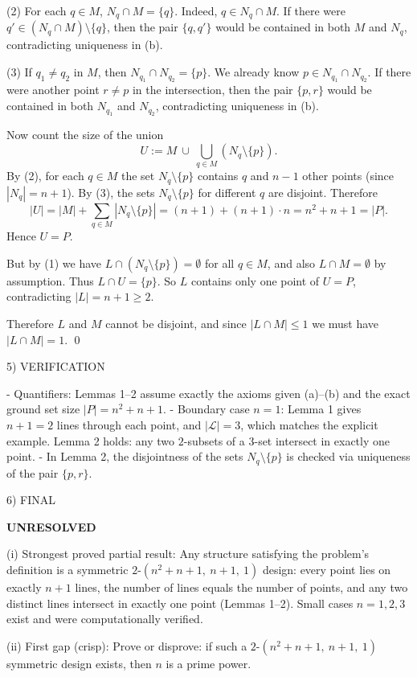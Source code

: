 (2) For each $q\in M$, $N_q\cap M = \{q\}$.
Indeed, $q\in N_q\cap M$. If there were $q'\in (N_q\cap M)\setminus\{q\}$, then the pair $\{q,q'\}$ would be contained in both $M$ and $N_q$, contradicting uniqueness in (b).

(3) If $q_1\ne q_2$ in $M$, then $N_{q_1}\cap N_{q_2}=\{p\}$.
We already know $p\in N_{q_1}\cap N_{q_2}$. If there were another point $r\ne p$ in the intersection, then the pair $\{p,r\}$ would be contained in both $N_{q_1}$ and $N_{q_2}$, contradicting uniqueness in (b).

Now count the size of the union
\[
U := M\ \cup\ \bigcup_{q\in M} (N_q\setminus\{p\}).
\]
By (2), for each $q\in M$ the set $N_q\setminus\{p\}$ contains $q$ and $n-1$ other points (since $|N_q|=n+1$).
By (3), the sets $N_q\setminus\{p\}$ for different $q$ are disjoint.
Therefore
\[
|U| = |M| + \sum_{q\in M} |N_q\setminus\{p\}| 
= (n+1) + (n+1)\cdot n 
= n^2+n+1 = |P|.
\]
Hence $U=P$.

But by (1) we have $L\cap (N_q\setminus\{p\})=\emptyset$ for all $q\in M$, and also $L\cap M=\emptyset$ by assumption. Thus $L\cap U = \{p\}$.
So $L$ contains only one point of $U=P$, contradicting $|L|=n+1\ge 2$.

Therefore $L$ and $M$ cannot be disjoint, and since $|L\cap M|\le 1$ we must have $|L\cap M|=1$.
\qed

5) VERIFICATION

- Quantifiers: Lemmas 1--2 assume exactly the axioms given (a)--(b) and the exact ground set size $|P|=n^2+n+1$.
- Boundary case $n=1$: Lemma 1 gives $n+1=2$ lines through each point, and $|\mathcal L|=3$, which matches the explicit example. Lemma 2 holds: any two $2$-subsets of a $3$-set intersect in exactly one point.
- In Lemma 2, the disjointness of the sets $N_q\setminus\{p\}$ is checked via uniqueness of the pair $\{p,r\}$.

6) FINAL

\textbf{UNRESOLVED}

(i) Strongest proved partial result: Any structure satisfying the problem's definition is a symmetric $2$-$(n^2+n+1,\ n+1,\ 1)$ design: every point lies on exactly $n+1$ lines, the number of lines equals the number of points, and any two distinct lines intersect in exactly one point (Lemmas 1--2). Small cases $n=1,2,3$ exist and were computationally verified.

(ii) First gap (crisp): Prove or disprove: if such a $2$-$(n^2+n+1,\ n+1,\ 1)$ symmetric design exists, then $n$ is a prime power.

